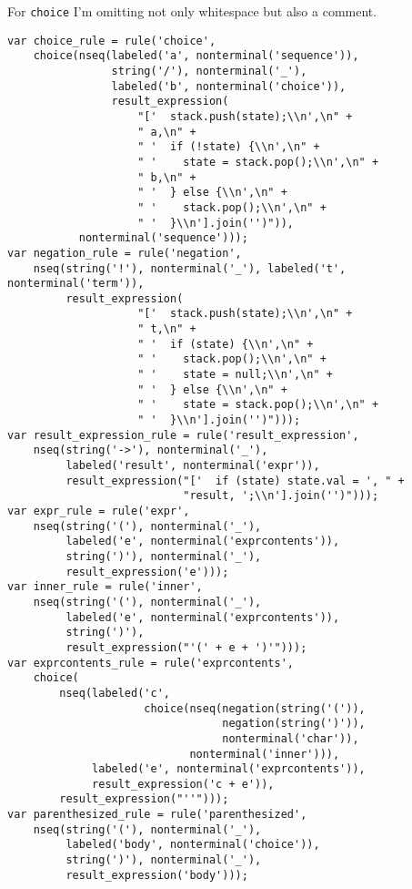 \documentclass[
]{article}
\begin{document}
For \texttt{choice} I'm omitting not only whitespace but also a comment.

\begin{verbatim}
var choice_rule = rule('choice',
    choice(nseq(labeled('a', nonterminal('sequence')),
                string('/'), nonterminal('_'),
                labeled('b', nonterminal('choice')),
                result_expression(
                    "['  stack.push(state);\\n',\n" +
                    " a,\n" +
                    " '  if (!state) {\\n',\n" +
                    " '    state = stack.pop();\\n',\n" +
                    " b,\n" +
                    " '  } else {\\n',\n" +
                    " '    stack.pop();\\n',\n" +
                    " '  }\\n'].join('')")),
           nonterminal('sequence')));
var negation_rule = rule('negation',
    nseq(string('!'), nonterminal('_'), labeled('t', nonterminal('term')),
         result_expression(
                    "['  stack.push(state);\\n',\n" +
                    " t,\n" +
                    " '  if (state) {\\n',\n" +
                    " '    stack.pop();\\n',\n" +
                    " '    state = null;\\n',\n" +
                    " '  } else {\\n',\n" +
                    " '    state = stack.pop();\\n',\n" +
                    " '  }\\n'].join('')")));
var result_expression_rule = rule('result_expression',
    nseq(string('->'), nonterminal('_'), 
         labeled('result', nonterminal('expr')),
         result_expression("['  if (state) state.val = ', " +
                           "result, ';\\n'].join('')")));
var expr_rule = rule('expr',
    nseq(string('('), nonterminal('_'),
         labeled('e', nonterminal('exprcontents')),
         string(')'), nonterminal('_'),
         result_expression('e')));
var inner_rule = rule('inner',
    nseq(string('('), nonterminal('_'),
         labeled('e', nonterminal('exprcontents')),
         string(')'),
         result_expression("'(' + e + ')'")));
var exprcontents_rule = rule('exprcontents',
    choice(
        nseq(labeled('c',
                     choice(nseq(negation(string('(')),
                                 negation(string(')')),
                                 nonterminal('char')),
                            nonterminal('inner'))),
             labeled('e', nonterminal('exprcontents')),
             result_expression('c + e')),
        result_expression("''")));
var parenthesized_rule = rule('parenthesized',
    nseq(string('('), nonterminal('_'),
         labeled('body', nonterminal('choice')),
         string(')'), nonterminal('_'),
         result_expression('body')));
\end{verbatim}
\end{document}
